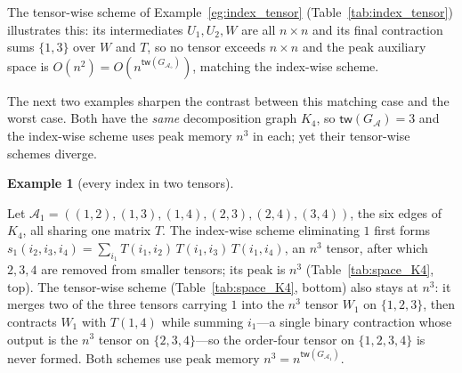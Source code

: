 \documentclass[sn-mathphys, natbib=false]{sn-jnl}
\theoremstyle{plain}
\theoremstyle{definition}
\newtheorem{example}{Example}
\newcommand{\treewidthp}[1]{\mathsf{tw}(#1)}
\newcommand{\completegraphp}[1]{K_{#1}}
\newcommand{\less}{O}
\newif\ifshowchanges
\newcommand{\rev}[1]{%
  \ifshowchanges
    {\color{red} #1}%
  \else
    #1%
  \fi
}
\def\calA{\mathcal{A}}
\begin{document}
\begin{bibunit}[agsm]
\rev{The tensor-wise scheme of Example~\ref{eg:index_tensor} (Table~\ref{tab:index_tensor}) illustrates this: its intermediates $U_1, U_2, W$ are all $n \times n$ and its final contraction sums $\{1,3\}$ over $W$ and $T$, so no tensor exceeds $n \times n$ and the peak auxiliary space is $\less(n^2) = \less(n^{\treewidthp{G_{\calA_\diamond}}})$, matching the index-wise scheme.}

\rev{The next two examples sharpen the contrast between this matching case and the worst case. Both have the \emph{same} decomposition graph $\completegraphp{4}$, so $\treewidthp{G_\calA} = 3$ and the index-wise scheme uses peak memory $n^3$ in each; yet their tensor-wise schemes diverge.}

\begin{example}[every index in two tensors]
\label{eg:space_K4}
\rev{Let $\calA_1 = ((1,2),(1,3),(1,4),(2,3),(2,4),(3,4))$, the six edges of $\completegraphp{4}$, all sharing one matrix $T$. The index-wise scheme eliminating $1$ first forms $s_1(i_2,i_3,i_4) = \sum_{i_1} T(i_1,i_2)\, T(i_1,i_3)\, T(i_1,i_4)$, an $n^3$ tensor, after which $2, 3, 4$ are removed from smaller tensors; its peak is $n^3$ (Table~\ref{tab:space_K4}, top). The tensor-wise scheme (Table~\ref{tab:space_K4}, bottom) also stays at $n^3$: it merges two of the three tensors carrying $1$ into the $n^3$ tensor $W_1$ on $\{1,2,3\}$, then contracts $W_1$ with $T(1,4)$ while summing $i_1$---a single binary contraction whose output is the $n^3$ tensor on $\{2,3,4\}$---so the order-four tensor on $\{1,2,3,4\}$ is never formed. Both schemes use peak memory $n^3 = n^{\treewidthp{G_{\calA_1}}}$.}
\end{example}


\end{bibunit}
\end{document}
